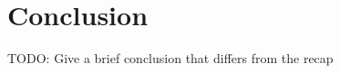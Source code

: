 \chapter{Conclusion}
\label{chap:conclusion}


TODO: Give a brief conclusion that differs from the recap
